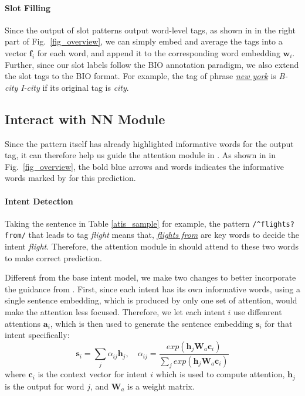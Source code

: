 \paragraph{Slot Filling}
Since the output of slot \RE patterns output word-level tags, as shown in  in the right part of Fig.~\ref{fig_overview}, we can simply embed and average the \RE tags into a vector $\textbf{f}_i$ for each word, and append it to the corresponding word embedding $\textbf{w}_i$. 
Further, since our slot labels follow the BIO annotation paradigm, we also extend the slot \RE tags to the BIO format. For example, the \RE tag of phrase \textsl{\underline{new york}} is \emph{B-city I-city} if its original tag is \emph{city}.

\subsection{Interact with NN Module}
\label{interact_with_module}
Since the \RE pattern itself has already highlighted informative words for the output tag, it can therefore help us guide the attention module in \NN.
As shown in  in Fig.~\ref{fig_overview}, the bold blue arrows and words indicates the informative words marked by \RE for this prediction.
\paragraph{Intent Detection}
Taking the sentence in Table \ref{atis_sample} for example, the pattern \texttt{/\textasciicircum flights?\:from/} that leads to tag \emph{flight} means that, \textsl{\underline{flights from}} are key words to decide the intent \emph{flight}. Therefore, the attention module in \NN should attend to these two words to make correct prediction. 

Different from the base intent model, we make two changes to better incorporate the guidance from \RE.
First, since each intent has its own informative words, using a single sentence embedding, which is produced by only one set of attention, would make the attention less focused. 
Therefore, we let each intent $i$ use diffenrent attentions $\textbf{a}_i$, which is then used to generate the sentence embedding $\textbf{s}_i$ for that intent specifically:
\begin{equation}
\textbf{s}_i = \sum_{j}{\alpha_{ij}\textbf{h}_j}, \quad
\alpha_{ij}=\frac{exp(\textbf{h}_j\textbf{W}_a\textbf{c}_i)}{\sum_{j}{exp(\textbf{h}_j\textbf{W}_a\textbf{c}_i)}}
\label{label_att_eq}
\end{equation}
where $\textbf{c}_i$ is the context vector for intent $i$ which is used to compute attention, $\textbf{h}_j$ is the \BLSTM output for word $j$, and $\textbf{W}_a$ is a weight matrix.

